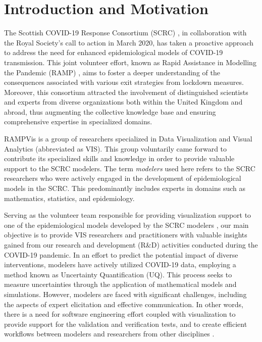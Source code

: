 \section{Introduction and Motivation}
\label{sec:intro}

The Scottish COVID-19 Response Consortium (SCRC) \cite{2020University}, in collaboration with the Royal Society's call to action in March 2020, has taken a proactive approach to address the need for enhanced epidemiological models of COVID-19 transmission.
This joint volunteer effort, known as Rapid Assistance in Modelling the Pandemic (RAMP) \cite{2020Rapid}, aims to foster a deeper understanding of the consequences associated with various exit strategies from lockdown measures.
Moreover, this consortium attracted the involvement of distinguished scientists and experts from diverse organizations both within the United Kingdom and abroad, thus augmenting the collective knowledge base and ensuring comprehensive expertise in specialized domains.

RAMPVis \cite{2020Visualization} is a group of researchers specialized in Data Visualization and Visual Analytics (abbreviated as VIS).
This group voluntarily came forward to contribute its specialized skills and knowledge in order to provide valuable support to the SCRC modelers.
The term \textit{modelers} used here refers to the SCRC researchers who were actively engaged in the development of epidemiological models in the SCRC.
This predominantly includes experts in domains such as mathematics, statistics, and epidemiology.

Serving as the volunteer team responsible for providing visualization support to one of the epidemiological models developed by the SCRC modelers \cite{chen2022RAMPVIS}, our main objective is to provide VIS researchers and practitioners with valuable insights gained from our research and development (R\&D) activities conducted during the COVID-19 pandemic.
In an effort to predict the potential impact of diverse interventions, modelers have actively utilized COVID-19 data, employing a method known as Uncertainty Quantification (UQ).
This process seeks to measure uncertainties through the application of mathematical models and simulations.
However, modelers are faced with significant challenges, including the aspects of expert elicitation and effective communication.
In other words, there is a need for software engineering effort coupled with visualization to provide support for the validation and verification tests, and to create efficient workflows between modelers and researchers from other disciplines \cite{ackland2022Royal}.

